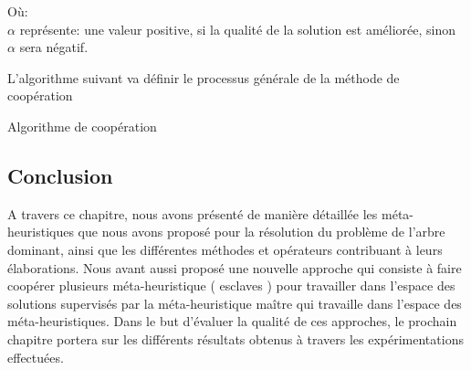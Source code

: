 Où:\\
$\alpha$ représente: une valeur positive, si la qualité de la solution est améliorée, sinon $\alpha$ sera négatif.

L’algorithme suivant va définir le processus générale de la méthode de coopération 

\begin{algorithm}[H]
\label{alg:CA}
\caption{Algorithme de coopération}
\SetAlgoLined
\DontPrintSemicolon

\end{algorithm}



\subsection{Conclusion}
A travers ce chapitre, nous avons présenté de manière détaillée les méta-heuristiques que nous avons proposé pour la résolution du problème de l’arbre dominant, ainsi que les différentes méthodes et opérateurs contribuant à leurs élaborations. Nous avant aussi proposé une nouvelle approche qui consiste à faire coopérer plusieurs méta-heuristique ( esclaves ) pour travailler dans l’espace des solutions supervisés par la méta-heuristique maître qui travaille dans l’espace des méta-heuristiques. Dans le but d’évaluer la qualité de ces approches, le prochain chapitre portera sur les différents résultats obtenus à travers les expérimentations effectuées.

